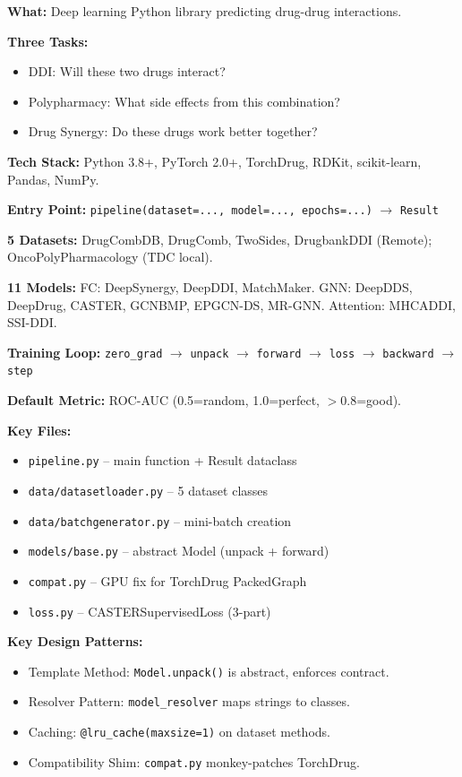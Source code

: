 \documentclass[12pt,a4paper,oneside]{book}
\begin{document}
\begin{tcolorbox}[cheatbox,title={ChemoInteract -- Complete Cheat Sheet}]

\textbf{What:} Deep learning Python library predicting drug-drug interactions.

\medskip
\textbf{Three Tasks:}
\begin{itemize}[noitemsep]
  \item DDI: Will these two drugs interact?
  \item Polypharmacy: What side effects from this combination?
  \item Drug Synergy: Do these drugs work better together?
\end{itemize}

\medskip
\textbf{Tech Stack:} Python 3.8+, PyTorch 2.0+, TorchDrug, RDKit, scikit-learn, Pandas, NumPy.

\medskip
\textbf{Entry Point:} \texttt{pipeline(dataset=..., model=..., epochs=...)} $\to$ \texttt{Result}

\medskip
\textbf{5 Datasets:} DrugCombDB, DrugComb, TwoSides, DrugbankDDI (Remote); OncoPolyPharmacology (TDC local).

\medskip
\textbf{11 Models:}
FC: DeepSynergy, DeepDDI, MatchMaker.
GNN: DeepDDS, DeepDrug, CASTER, GCNBMP, EPGCN-DS, MR-GNN.
Attention: MHCADDI, SSI-DDI.

\medskip
\textbf{Training Loop:} \texttt{zero\_grad} $\to$ \texttt{unpack} $\to$ \texttt{forward} $\to$ \texttt{loss} $\to$ \texttt{backward} $\to$ \texttt{step}

\medskip
\textbf{Default Metric:} ROC-AUC (0.5=random, 1.0=perfect, $>$0.8=good).

\medskip
\textbf{Key Files:}
\begin{itemize}[noitemsep]
  \item \texttt{pipeline.py} -- main function + Result dataclass
  \item \texttt{data/datasetloader.py} -- 5 dataset classes
  \item \texttt{data/batchgenerator.py} -- mini-batch creation
  \item \texttt{models/base.py} -- abstract Model (unpack + forward)
  \item \texttt{compat.py} -- GPU fix for TorchDrug PackedGraph
  \item \texttt{loss.py} -- CASTERSupervisedLoss (3-part)
\end{itemize}

\medskip
\textbf{Key Design Patterns:}
\begin{itemize}[noitemsep]
  \item Template Method: \texttt{Model.unpack()} is abstract, enforces contract.
  \item Resolver Pattern: \texttt{model\_resolver} maps strings to classes.
  \item Caching: \texttt{@lru\_cache(maxsize=1)} on dataset methods.
  \item Compatibility Shim: \texttt{compat.py} monkey-patches TorchDrug.
\end{itemize}


\end{tcolorbox}
\end{document}

